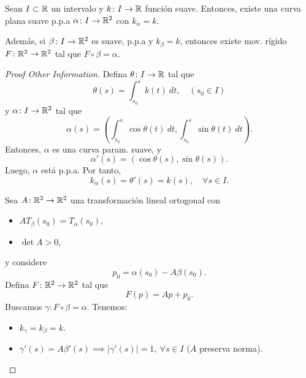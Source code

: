 \begin{theorem}
	Sean $I \subset \mathbb{R}$ un intervalo y $k \colon I \to \mathbb{R}$ función suave. Entonces, existe una curva plana suave p.p.a $\alpha \colon I \to \mathbb{R}^{2}$ con $k_{\alpha} = k$. \par
	Además, si $\beta \colon I \to \mathbb{R}^{2}$ es suave, p.p.a y $k_{\beta} = k$, entonces existe mov. rígido $F \colon \mathbb{R}^{2} \to \mathbb{R}^{2}$ tal que $F \circ \beta = \alpha$.
\end{theorem}
\begin{proof}[Proof Other Information]
	 Defina $\theta \colon I \to \mathbb{R}$ tal que 
	\[ \theta(s) = \int_{s_{0}}^{s} k(t) \ dt, \quad (s_{0} \in I) \]
	y $\alpha \colon I \to \mathbb{R}^{2}$ tal que
	\[ \alpha(s) = \left( \int_{s_{0}}^{s} \cos \theta(t) \ dt, \int_{s_{0}}^{s} \sin \theta(t) \ dt \right). \]
	Entonces, $\alpha$ es una curva param. suave, y
	\[ \alpha'(s) = (\cos \theta(s), \sin \theta(s)). \]
	Luego, $\alpha$ está p.p.a. Por tanto, 
	\[ k_{\alpha}(s) = \theta'(s) = k(s), \quad \forall s \in I. \]
	\par {} Sea $A \colon \mathbb{R}^{2} \to \mathbb{R}^{2}$ una transformación lineal ortogonal con
	\begin{itemize}
		\item $A T_{\beta}(s_{0}) = T_{\alpha}(s_{0})$,

		\item $\det A > 0$,
	\end{itemize}
	y considere
	\[ p_{0} = \alpha(s_{0}) - A \beta(s_{0}). \]
	Defina $F \colon \mathbb{R}^{2} \to \mathbb{R}^{2}$ tal que
	\[ F(p) = A p + p_{0}. \]
	Buscamos $\gamma \colon F \circ \beta = \alpha$. Tenemos:
	\begin{itemize}
		\item $k_{\gamma} = k_{\beta} = k$.

		\item $\gamma'(s) = A \beta'(s) \implies |\gamma'(s)| = 1,\ \forall s \in I$ ($A$ preserva norma).


\end{itemize}
\end{proof}
